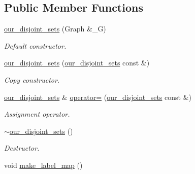 \subsection*{Public Member Functions}
\begin{DoxyCompactItemize}
\item 
\hypertarget{classour__disjoint__sets_aa393efe7852a167a8134114122c3d4ce}{
\hyperlink{classour__disjoint__sets_aa393efe7852a167a8134114122c3d4ce}{our\_\-disjoint\_\-sets} (Graph \&\_\-G)}
\label{classour__disjoint__sets_aa393efe7852a167a8134114122c3d4ce}

\begin{DoxyCompactList}\small\item\em Default constructor. \item\end{DoxyCompactList}\item 
\hypertarget{classour__disjoint__sets_a7c887672236b2983a5e492f7f14cb183}{
\hyperlink{classour__disjoint__sets_a7c887672236b2983a5e492f7f14cb183}{our\_\-disjoint\_\-sets} (\hyperlink{classour__disjoint__sets}{our\_\-disjoint\_\-sets} const \&)}
\label{classour__disjoint__sets_a7c887672236b2983a5e492f7f14cb183}

\begin{DoxyCompactList}\small\item\em Copy constructor. \item\end{DoxyCompactList}\item 
\hypertarget{classour__disjoint__sets_a4985692effbfcd92fe0b4ed6776da712}{
\hyperlink{classour__disjoint__sets}{our\_\-disjoint\_\-sets} \& \hyperlink{classour__disjoint__sets_a4985692effbfcd92fe0b4ed6776da712}{operator=} (\hyperlink{classour__disjoint__sets}{our\_\-disjoint\_\-sets} const \&)}
\label{classour__disjoint__sets_a4985692effbfcd92fe0b4ed6776da712}

\begin{DoxyCompactList}\small\item\em Assignment operator. \item\end{DoxyCompactList}\item 
\hypertarget{classour__disjoint__sets_ac6753772c2b17555361b59826b4e3c35}{
\hyperlink{classour__disjoint__sets_ac6753772c2b17555361b59826b4e3c35}{$\sim$our\_\-disjoint\_\-sets} ()}
\label{classour__disjoint__sets_ac6753772c2b17555361b59826b4e3c35}

\begin{DoxyCompactList}\small\item\em Destructor. \item\end{DoxyCompactList}\item 
\hypertarget{classour__disjoint__sets_a94bb24df48460d40143758c9a4c3a7ef}{
void \hyperlink{classour__disjoint__sets_a94bb24df48460d40143758c9a4c3a7ef}{make\_\-label\_\-map} ()}
\label{classour__disjoint__sets_a94bb24df48460d40143758c9a4c3a7ef}


\end{DoxyCompactItemize}
